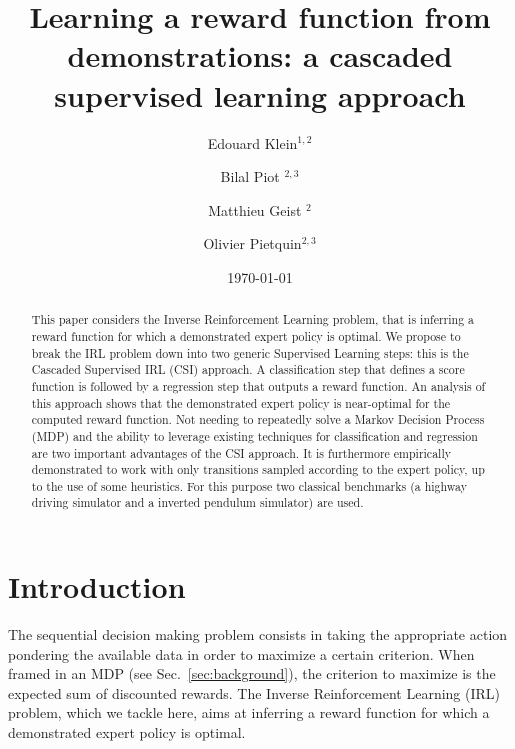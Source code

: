 \documentclass[smallextended]{svjour3}
\begin{document}
\title{Learning a reward function from demonstrations: a cascaded supervised learning approach}
\author{Edouard Klein$^{1,2}$ \and Bilal Piot $^{2,3}$\and Matthieu Geist $^{2}$\and Olivier Pietquin$^{2,3}$}
\date{\today}


\maketitle

\begin{abstract}
  This paper considers the Inverse Reinforcement Learning problem, that is inferring a reward function for which a demonstrated expert policy is optimal.
We propose to break the IRL problem down into two generic Supervised Learning steps: this is the Cascaded Supervised IRL (CSI) approach. A classification step that defines a score function is followed by a regression step that outputs a reward function.
An analysis of this approach shows that the demonstrated expert policy is near-optimal for the computed reward function.
Not needing to repeatedly solve a Markov Decision Process (MDP) and the ability to leverage existing techniques for classification and regression are two important advantages of the CSI approach. It is furthermore empirically demonstrated to work with only transitions sampled according to the expert policy, up to the use of some heuristics. For this purpose two classical benchmarks (a highway driving simulator and a inverted pendulum simulator) are used.
  \end{abstract}
\section{Introduction}
\label{sec-2}
The sequential decision making problem consists in taking the appropriate action pondering the available data in order to maximize a certain criterion. When framed in an MDP (see Sec.~\ref{sec:background}), the criterion to maximize is the expected sum of discounted rewards. The Inverse Reinforcement Learning (IRL)~\cite{russell1998learning} problem, which we tackle here, aims at inferring a reward function for which a demonstrated expert policy is optimal.
\end{document}
